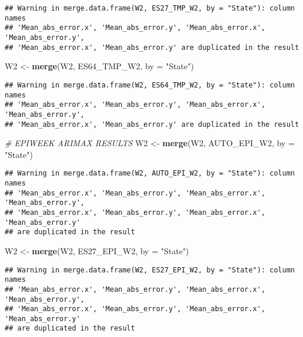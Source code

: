 \documentclass[
]{article}
\newenvironment{Shaded}{\begin{snugshade}}{\end{snugshade}}
\newcommand{\AttributeTok}[1]{\textcolor[rgb]{0.13,0.29,0.53}{#1}}
\newcommand{\CommentTok}[1]{\textcolor[rgb]{0.56,0.35,0.01}{\textit{#1}}}
\newcommand{\FunctionTok}[1]{\textcolor[rgb]{0.13,0.29,0.53}{\textbf{#1}}}
\newcommand{\NormalTok}[1]{#1}
\newcommand{\OtherTok}[1]{\textcolor[rgb]{0.56,0.35,0.01}{#1}}
\newcommand{\StringTok}[1]{\textcolor[rgb]{0.31,0.60,0.02}{#1}}
\begin{document}
\begin{verbatim}
## Warning in merge.data.frame(W2, ES27_TMP_W2, by = "State"): column names
## 'Mean_abs_error.x', 'Mean_abs_error.y', 'Mean_abs_error.x', 'Mean_abs_error.y',
## 'Mean_abs_error.x', 'Mean_abs_error.y' are duplicated in the result
\end{verbatim}

\begin{Shaded}
\begin{Highlighting}[]
\NormalTok{W2 }\OtherTok{\textless{}{-}} \FunctionTok{merge}\NormalTok{(W2, ES64\_TMP\_W2, }\AttributeTok{by =} \StringTok{"State"}\NormalTok{)}
\end{Highlighting}
\end{Shaded}

\begin{verbatim}
## Warning in merge.data.frame(W2, ES64_TMP_W2, by = "State"): column names
## 'Mean_abs_error.x', 'Mean_abs_error.y', 'Mean_abs_error.x', 'Mean_abs_error.y',
## 'Mean_abs_error.x', 'Mean_abs_error.y' are duplicated in the result
\end{verbatim}

\begin{Shaded}
\begin{Highlighting}[]
\CommentTok{\# EPIWEEK ARIMAX RESULTS}
\NormalTok{W2 }\OtherTok{\textless{}{-}} \FunctionTok{merge}\NormalTok{(W2, AUTO\_EPI\_W2, }\AttributeTok{by =} \StringTok{"State"}\NormalTok{)}
\end{Highlighting}
\end{Shaded}

\begin{verbatim}
## Warning in merge.data.frame(W2, AUTO_EPI_W2, by = "State"): column names
## 'Mean_abs_error.x', 'Mean_abs_error.y', 'Mean_abs_error.x', 'Mean_abs_error.y',
## 'Mean_abs_error.x', 'Mean_abs_error.y', 'Mean_abs_error.x', 'Mean_abs_error.y'
## are duplicated in the result
\end{verbatim}

\begin{Shaded}
\begin{Highlighting}[]
\NormalTok{W2 }\OtherTok{\textless{}{-}} \FunctionTok{merge}\NormalTok{(W2, ES27\_EPI\_W2, }\AttributeTok{by =} \StringTok{"State"}\NormalTok{)}
\end{Highlighting}
\end{Shaded}

\begin{verbatim}
## Warning in merge.data.frame(W2, ES27_EPI_W2, by = "State"): column names
## 'Mean_abs_error.x', 'Mean_abs_error.y', 'Mean_abs_error.x', 'Mean_abs_error.y',
## 'Mean_abs_error.x', 'Mean_abs_error.y', 'Mean_abs_error.x', 'Mean_abs_error.y'
## are duplicated in the result
\end{verbatim}
\end{document}
